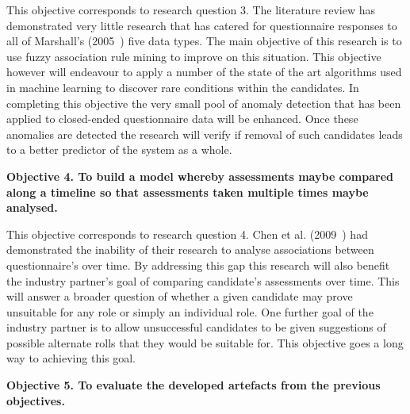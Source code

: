 This objective corresponds to research question 3. The literature review has demonstrated very little research that has catered for questionnaire responses to all of Marshall's (2005~\cite{marshall2005purpose}) five data types. The main objective of this research is to use fuzzy association rule mining to improve on this situation. This objective however will endeavour to apply a number of the state of the art algorithms used in machine learning to discover rare conditions within the candidates. In completing this objective the very small pool of anomaly detection that has been applied to closed-ended questionnaire data will be enhanced. Once these anomalies are detected the research will verify if removal of such candidates leads to a better predictor of the system as a whole.

\textbf{Objective 4. To build a model whereby assessments maybe compared along a timeline so that assessments taken multiple times maybe analysed.}

This objective corresponds to research question 4. Chen et al. (2009~\cite{chen2009mining}) had demonstrated the inability of their research to analyse associations between questionnaire's over time. By addressing this gap this research will also benefit the industry partner's goal of comparing candidate's assessments over time. This will answer a broader question of whether a given candidate may prove unsuitable for any role or simply an individual role. One further goal of the industry partner is to allow unsuccessful candidates to be given suggestions of possible alternate rolls that they would be suitable for. This objective goes a long way to achieving this goal.




\textbf{Objective 5. To evaluate the developed artefacts from the previous objectives.}


